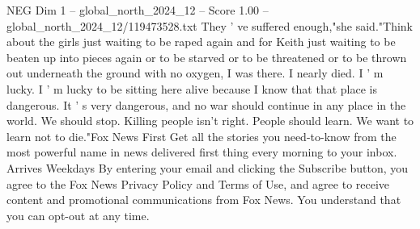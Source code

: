 \begin{textsample}{NEG Dim 1 – global\_north\_2024\_12 – Score 1.00 – global\_north\_2024\_12/119473528.txt}
They ' ve suffered enough,"she said."Think about the girls just waiting to be raped again and for Keith just waiting to be beaten up into pieces again or to be starved or to be threatened or to be thrown out underneath the ground with no oxygen, I was there.
I nearly died.
I ' m lucky.
I ' m lucky to be sitting here alive because I know that that place is dangerous.
It ' s very dangerous, and no war should continue in any place in the world.
We should stop.
Killing people isn't right.
People should learn.
We want to learn not to die."Fox News First Get all the stories you need-to-know from the most powerful name in news delivered first thing every morning to your inbox.
Arrives Weekdays By entering your email and clicking the Subscribe button, you agree to the Fox News Privacy Policy and Terms of Use, and agree to receive content and promotional communications from Fox News.
You understand that you can opt-out at any time.

\end{textsample}
